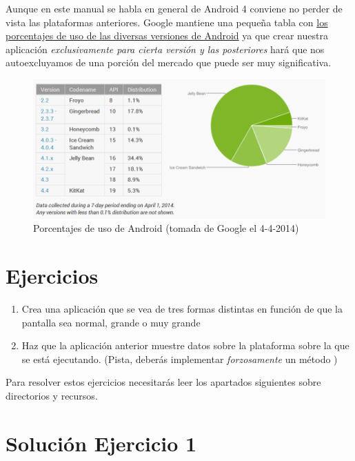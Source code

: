 \documentclass[a4paper,12pt,spanish]{sphinxmanual}
\begin{document}
Aunque en este manual se habla en general de Android 4 conviene no perder de vista las plataformas anteriores. Google mantiene una pequeña tabla con \href{http://developer.android.com/about/dashboards/index.html}{los porcentajes de uso de las diversas versiones de Android} ya que crear nuestra aplicación \emph{exclusivamente para cierta versión y las posteriores} hará que nos autoexcluyamos de una porción del mercado que puede ser muy significativa.
\begin{figure}[htbp]
\centering
\capstart

\includegraphics{porcentajesuso.png}
\caption{Porcentajes de uso de Android (tomada de Google el 4-4-2014)}\end{figure}


\section{Ejercicios}
\label{tema1:ejercicios}\begin{enumerate}
\item {} 
Crea una aplicación que se vea de tres formas distintas en función de que la pantalla sea normal, grande o muy grande

\item {} 
Haz que la aplicación anterior muestre datos sobre la plataforma sobre la que se está ejecutando. (Pista, deberás implementar \emph{forzosamente} un método )

\end{enumerate}

Para resolver estos ejercicios necesitarás leer los apartados siguientes sobre directorios y recursos.


\section{Solución Ejercicio 1}
\label{tema1:solucion-ejercicio-1}
\end{document}
